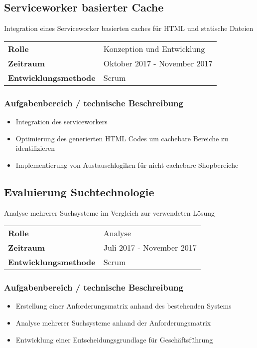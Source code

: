 \documentclass[10pt,ngerman,a4paper]{article}
\begin{document}
\subsection{Serviceworker basierter Cache}
Integration eines Serviceworker basierten caches für HTML und statische Dateien

\begin{tabular}{ll}
\textbf{Rolle} & Konzeption und Entwicklung \\
\textbf{Zeitraum} & Oktober 2017 - November 2017\\
\textbf{Entwicklungsmethode} & Scrum
\end{tabular}

\subsubsection{Aufgabenbereich / technische Beschreibung}
\begin{itemize}
\item Integration des serviceworkers
\item Optimierung des generierten HTML Codes um cachebare Bereiche zu identifizieren
\item Implementierung von Austauschlogiken für nicht cachebare Shopbereiche
\end{itemize}

\subsection{Evaluierung Suchtechnologie}
Analyse mehrerer Suchsysteme im Vergleich zur verwendeten Lösung

\begin{tabular}{ll}
\textbf{Rolle} & Analyse \\
\textbf{Zeitraum} & Juli 2017 - November 2017\\
\textbf{Entwicklungsmethode} & Scrum
\end{tabular}

\subsubsection{Aufgabenbereich / technische Beschreibung}
\begin{itemize}
\item Erstellung einer Anforderungsmatrix anhand des bestehenden Systems
\item Analyse mehrerer Suchsysteme anhand der Anforderungsmatrix
\item Entwicklung einer Entscheidungsgrundlage für Geschäftsführung
\end{itemize}
\end{document}
